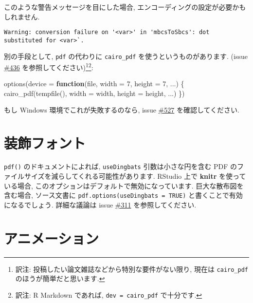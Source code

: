 \documentclass[
]{bxjsreport}
\newenvironment{Shaded}{\begin{snugshade}}{\end{snugshade}}
\newcommand{\AttributeTok}[1]{\textcolor[rgb]{0.77,0.63,0.00}{#1}}
\newcommand{\ControlFlowTok}[1]{\textcolor[rgb]{0.13,0.29,0.53}{\textbf{#1}}}
\newcommand{\DecValTok}[1]{\textcolor[rgb]{0.00,0.00,0.81}{#1}}
\newcommand{\FunctionTok}[1]{\textcolor[rgb]{0.00,0.00,0.00}{#1}}
\newcommand{\NormalTok}[1]{#1}
\begin{document}
このような警告メッセージを目にした場合,
エンコーディングの設定が必要かもしれません.

\begin{verbatim}
Warning: conversion failure on '<var>' in 'mbcsToSbcs': dot substituted for <var>`.
\end{verbatim}

別の手段として, \texttt{pdf} の代わりに \texttt{cairo\_pdf}
を使うというものがあります. (issue
\href{https://github.com/yihui/knitr/issues/436}{\#436}
を参照してください)\footnote{訳注:
  投稿したい論文雑誌などから特別な要件がない限り, 現在は
  \texttt{cairo\_pdf} のほうが簡単だと思います.}\footnote{訳注: R
  Markdown であれば,
  \texttt{dev\ =\ \textquotesingle{}cairo\_pdf\textquotesingle{}}
  で十分です.}:

\begin{Shaded}
\begin{Highlighting}[numbers=left,,]
\FunctionTok{options}\NormalTok{(}\AttributeTok{device =} \ControlFlowTok{function}\NormalTok{(file, }\AttributeTok{width =} \DecValTok{7}\NormalTok{, }\AttributeTok{height =} \DecValTok{7}\NormalTok{, ...) \{}
  \FunctionTok{cairo\_pdf}\NormalTok{(}\FunctionTok{tempfile}\NormalTok{(), }\AttributeTok{width =}\NormalTok{ width, }\AttributeTok{height =}\NormalTok{ height, ...)}
\NormalTok{\})}
\end{Highlighting}
\end{Shaded}

もし Windows 環境でこれが失敗するのなら, issue
\href{https://github.com/yihui/knitr/issues/527}{\#527}
を確認してください.

\hypertarget{ux88c5ux98feux30d5ux30a9ux30f3ux30c8}{%
\section*{装飾フォント}\label{ux88c5ux98feux30d5ux30a9ux30f3ux30c8}}

\texttt{pdf()} のドキュメントによれば, \texttt{useDingbats}
引数は小さな円を含む PDF
のファイルサイズを減らしてくれる可能性があります. RStudio 上で
\textbf{knitr} を使っている場合,
このオプションはデフォルトで無効になっています. 巨大な散布図を含む場合,
ソース文書に \texttt{pdf.options(useDingbats\ =\ TRUE)}
と書くことで有効になるでしょう. 詳細な議論は issue
\href{https://github.com/yihui/knitr/issues/311}{\#311}
を参照してください.

\hypertarget{ux30a2ux30cbux30e1ux30fcux30b7ux30e7ux30f3}{%
\section*{アニメーション}\label{ux30a2ux30cbux30e1ux30fcux30b7ux30e7ux30f3}}
\end{document}
